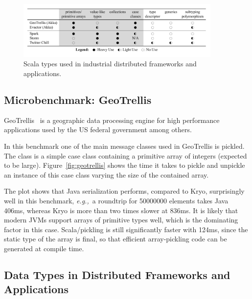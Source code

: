 \documentclass[10pt]{sigplanconf}
\theoremstyle{definition}
\theoremstyle{definition}
\newcommand{\eg}{{\em e.g.,~}}
\begin{document}
\begin{figure}[ht!]
 \centering
 \includegraphics[width=0.9\textwidth]{application-table.pdf}
 \vspace{-1em}
 \caption{Scala types used in industrial distributed frameworks and applications.}
 \label{fig:application-table}
\end{figure}

\subsection{Microbenchmark: GeoTrellis}

GeoTrellis~\cite{GeoTrellis} is a geographic data processing engine for high performance applications used by the US federal government among others.

In this benchmark one of the main message classes used in GeoTrellis is pickled. The class is a simple case class containing a primitive array of integers (expected to be large). Figure~\ref{fig:geotrellis} shows the time it takes to pickle and unpickle an instance of this case class varying the size of the contained array.

The plot shows that Java serialization performs, compared to Kryo, surprisingly well in this benchmark, \eg a roundtrip for 50000000 elements takes Java 406ms, whereas Kryo is more than two times slower at 836ms. It is likely that modern JVMs support arrays of primitive types well, which is the dominating factor in this case. Scala/pickling is still significantly faster with 124ms, since the static type of the array is final, so that efficient array-pickling code can be generated at compile time.

\subsection{Data Types in Distributed Frameworks and Applications}
\label{sec:data-types-in-distributed-applications}
\end{document}
